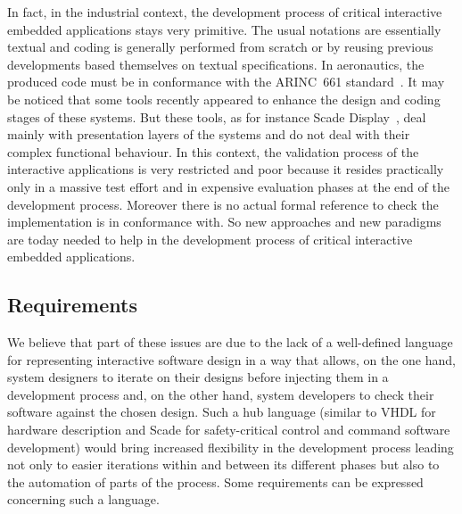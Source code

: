 In  fact,  in  the  industrial context,  the  development  process  of
critical interactive  embedded applications stays very  primitive. The
usual  notations  are  essentially  textual and  coding  is  generally
performed  from  scratch or  by  reusing  previous developments  based
themselves  on textual  specifications. In  aeronautics, the  produced
code must be in  conformance with the ARINC~661 standard~\cite{ARINC}.
It may  be noticed that  some tools  recently appeared to  enhance the
design and  coding stages of these  systems.  But these tools,  as for
instance   Scade   Display~\cite{scade-display},  deal   mainly   with
presentation layers of the systems and  do not deal with their complex
functional behaviour. In  this context, the validation  process of the
interactive  applications  is  very  restricted and  poor  because  it
resides practically  only in  a massive test  effort and  in expensive
evaluation phases  at the  end of  the development  process.  Moreover
there is no actual formal reference  to check the implementation is in
conformance with. So new approaches and new paradigms are today needed
to help  in the development  process of critical  interactive embedded
applications.

\subsection{Requirements}

We  believe that  part  of these  issues  are  due to  the  lack of  a
well-defined language for representing  interactive software design in
a way  that allows, on  the one hand,  system designers to  iterate on
their designs before  injecting them in a development  process and, on
the other hand, system developers  to check their software against the
chosen  design. Such  a hub  language  (similar to  VHDL for  hardware
description and Scade for safety-critical control and command software
development)  would bring  increased  flexibility  in the  development
process leading not  only to easier iterations within  and between its
different phases but  also to the automation of parts  of the process.
Some requirements can be expressed concerning such a language.

